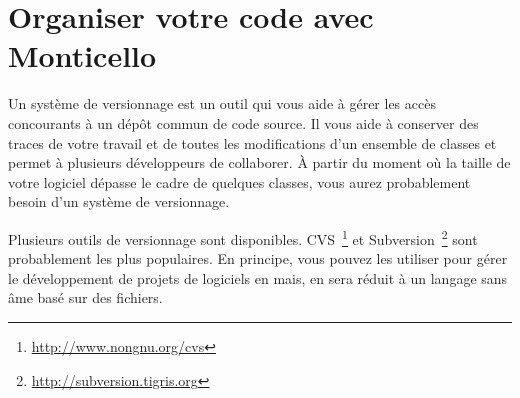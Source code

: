 \documentclass[a4paper,10pt,twoside]{book}
\begin{document}
	\renewcommand{\nnbb}[2]{} %
	\sloppy
\fi

\newcommand{\figlabel}[1]{\label{fig:#1}}
\newcommand{\seclabel}[1]{\label{sec:#1}}

\chapter{Organiser votre code avec Monticello}



\noindent
{}


Un syst\`eme de versionnage est un outil qui vous aide \`a g\'erer les
acc\`es concourants \`a un d\'ep\^ot commun de code source. Il vous
aide \`a conserver des traces de votre travail et de toutes les
modifications d'un ensemble de classes et permet \`a plusieurs
d\'eveloppeurs de collaborer. \`A partir du moment o\`u la taille de
votre logiciel d\'epasse le cadre de quelques classes, vous aurez
probablement besoin d'un syst\`eme de versionnage.

Plusieurs outils de versionnage sont
disponibles. CVS~\footnote{\url{http://www.nongnu.org/cvs}} et
Subversion~\footnote{\url{http://subversion.tigris.org}} sont
probablement les plus populaires.
En principe, vous pouvez les utiliser pour g\'erer le d\'eveloppement
de projets de logiciels en \sq mais, \sq en sera r\'eduit \`a un
langage sans \^ame bas\'e sur des fichiers.
 
\end{document}

